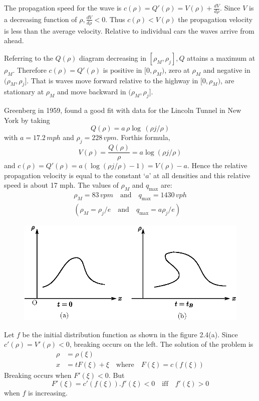 The propagation speed for the wave is $c(\rho)=Q'(\rho)=V(\rho)+\frac{dV}{d\rho}$. Since $V$ is a decreasing function of $\rho, \frac{dV}{d\rho}<0$. Thus $c(\rho)<V(\rho)$ \ie the propagation velocity is less than the average velocity. Relative to individual cars the waves arrive from ahead.

Referring to the $Q(\rho)$ diagram decreasing in $[\rho_M,\rho_j], Q$ attains a maximum at $\rho_M$. Therefore $c(\rho)=Q'(\rho)$ is positive in $[0,\rho_M)$, zero at $\rho_M$ and negative in $(\rho_M,\rho_j]$. That is waves move forward relative to the highway in $[0,\rho_M)$, are stationary at $\rho_M$ and move backward in $(\rho_M,\rho_j]$.

Greenberg in 1959, found a good fit with data for the Lincoln Tunnel in New York by taking
$$
Q(\rho)=a \,\rho\log \,(\rho j/\rho)
$$
with $a=17.2\, mph$ and $\rho_j=228\, vpm$. For\pageoriginale this formula,
$$
V(\rho)=\frac{Q(\rho)}{\rho}=a\log(\rho j/\rho)
$$
and $c(\rho)=Q'(\rho)=a(\log(\rho j/\rho)-1)=V(\rho)-a$. Hence the relative propagation velocity is equal to the constant `$a$' at all densities and this relative speed is about 17 mph. The values of $\rho_M$ and $q_{\max}$ are:
\begin{gather*}
\rho_M=83\, vpm\quad\text{and}\quad q_{\max}=1430\, vph\\
\left(\rho_M=\rho_j/e\quad\text{and}\quad q_{\max}=a\rho_j/e\right)
\end{gather*}

\begin{figure}[H]
\centering
\includegraphics{figures/fig61-2.4.eps}
\caption{}
\label{chap1:fig2.4}
\end{figure}

Let $f$ be the initial distribution function as shown in the figure 2.4(a). Since $c'(\rho)=V'(\rho)<0$, breaking occurs on the left. The solution of the problem is 
\begin{align*}
\rho &= \rho(\xi)\\
x &= tF(\xi)+\xi\quad\text{where}\quad F(\xi)=c(f(\xi))
\end{align*}
Breaking occurs when $F'(\xi)<0$. But
$$
F'(\xi)=c'(f(\xi)). f'(\xi)<0\quad\text{iff}\quad f'(\xi)>0
$$
\ie when $f$ is increasing.

